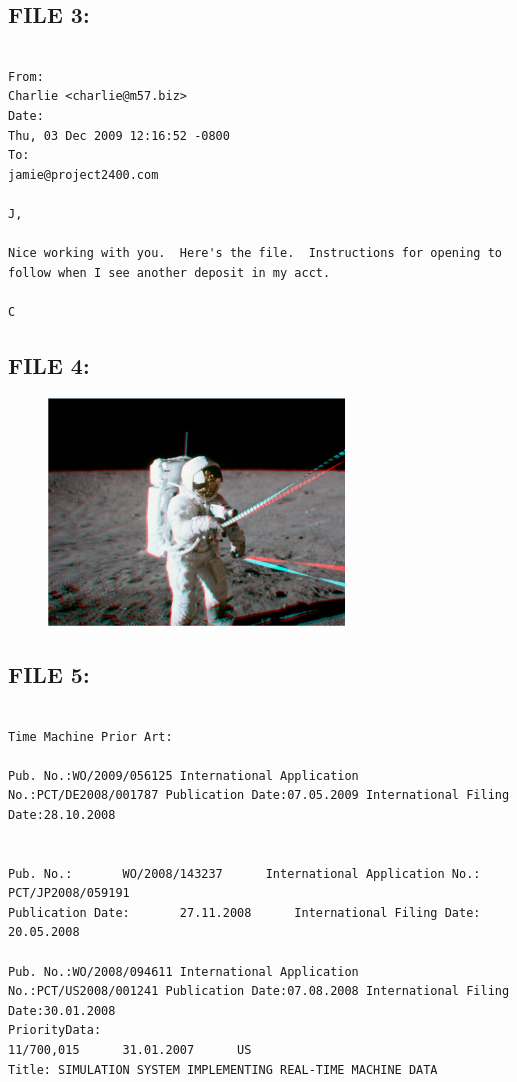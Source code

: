 \subsection{FILE 3:}
\label{sec:charlie_daten_3}

\begin{lstlisting}

From:
Charlie <charlie@m57.biz>
Date:
Thu, 03 Dec 2009 12:16:52 -0800
To:
jamie@project2400.com

J,

Nice working with you.  Here's the file.  Instructions for opening to follow when I see another deposit in my acct.

C

\end{lstlisting}

\subsection{FILE 4:}
\label{sec:charlie_daten_4}

\begin{figure}[H]
	\centering
	\includegraphics[width=0.7\textwidth]{daten/pics/astronaut1.jpg}
\end{figure}

\subsection{FILE 5:}
\label{sec:charlie_daten_5}

\begin{lstlisting}

Time Machine Prior Art:

Pub. No.:WO/2009/056125 International Application No.:PCT/DE2008/001787 Publication Date:07.05.2009 International Filing Date:28.10.2008


Pub. No.:		WO/2008/143237		International Application No.:		PCT/JP2008/059191
Publication Date:		27.11.2008		International Filing Date:		20.05.2008

Pub. No.:WO/2008/094611 International Application No.:PCT/US2008/001241 Publication Date:07.08.2008 International Filing Date:30.01.2008
PriorityData:
11/700,015		31.01.2007		US
Title: SIMULATION SYSTEM IMPLEMENTING REAL-TIME MACHINE DATA


\end{lstlisting}

